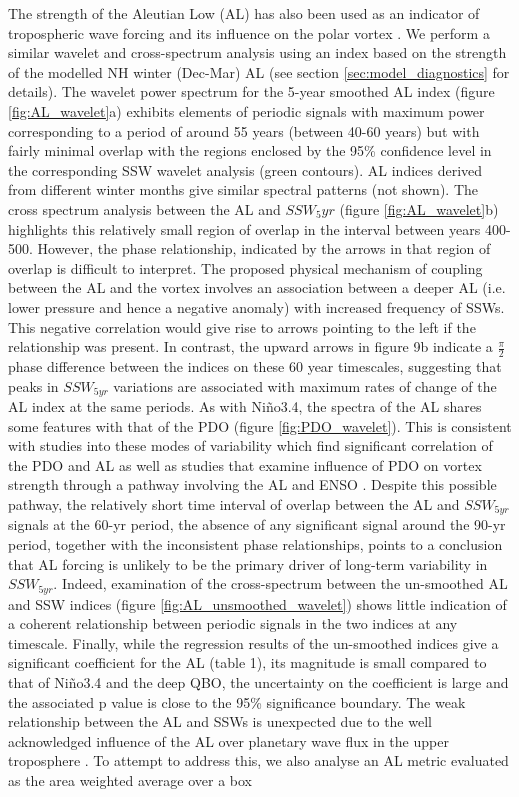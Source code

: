 The strength of the Aleutian Low (AL) has also been used as an indicator of tropospheric wave forcing and its influence on the polar vortex \citep{wooConnection2015}. We perform a similar wavelet and cross-spectrum analysis using an index based on the strength of the modelled NH winter (Dec-Mar) AL (see section \ref{sec:model_diagnostics} for details). The wavelet power spectrum for the 5-year smoothed AL index (figure \ref{fig:AL_wavelet}a) exhibits elements of periodic signals with maximum power corresponding to a period of around 55 years (between 40-60 years) but with fairly minimal overlap with the regions enclosed by the 95\% confidence level in the corresponding SSW wavelet analysis (green contours). AL indices derived from different winter months give similar spectral patterns (not shown).  The cross spectrum analysis between the AL and $SSW_5yr$ (figure \ref{fig:AL_wavelet}b) highlights this relatively small region of overlap in the interval between years 400-500. However, the phase relationship, indicated by the arrows in that region of overlap is difficult to interpret. The proposed physical mechanism of coupling between the AL and the vortex \citep{wooConnection2015} involves an association between a deeper AL (i.e. lower pressure and hence a negative anomaly) with increased frequency of SSWs. This negative correlation would give rise to arrows pointing to the left if the relationship was present. In contrast, the upward arrows in figure 9b indicate a $\frac{\pi}{2}$ phase difference between the indices on these 60 year timescales, suggesting that peaks in $SSW_{5yr}$ variations are associated with maximum rates of change of the AL index at the same periods. As with Ni\~{n}o3.4, the spectra of the AL shares some features with that of the PDO (figure \ref{fig:PDO_wavelet}). This is consistent with studies into these modes of variability which find significant correlation of the PDO and AL \citep{mantuaPacific1997, rodionovSpatial2005} as well as studies that examine influence of PDO on vortex strength through a pathway involving the AL and ENSO \citep{raoModulation2019}. Despite this possible pathway, the relatively short time interval of overlap between the AL and $SSW_{5yr}$ signals at the 60-yr period, the absence of any significant signal around the 90-yr period, together with the inconsistent phase relationships, points to a conclusion that AL forcing is unlikely to be the primary driver of long-term variability in $SSW_{5yr}$. Indeed, examination of the cross-spectrum between the un-smoothed AL and SSW indices (figure \ref{fig:AL_unsmoothed_wavelet}) shows little indication of a coherent relationship between periodic signals in the two indices at any timescale. Finally, while the regression results of the un-smoothed indices give a significant coefficient for the AL (table 1), its magnitude is small compared to that of Ni\~{n}o3.4 and the deep QBO, the uncertainty on the coefficient is large and the associated p value is close to the 95\% significance boundary. The weak relationship between the AL and SSWs is unexpected due to the well acknowledged influence of the AL over planetary wave flux in the upper troposphere \citep{wooConnection2015}. To attempt to address this, we also analyse an AL metric evaluated as the area weighted average over a box 